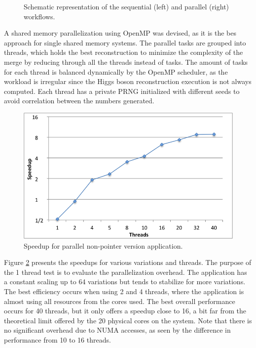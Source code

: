 \begin{figure}[!htp]
\begin{center}
		\caption{Schematic representation of the \ttDilepKinFit sequential (left) and parallel (right) workflows.}
		\label{fig:SeqPipeline}
	\end{center}
\end{figure}

A shared memory parallelization using OpenMP was devised, as it is the bes approach for single shared memory systems. The parallel tasks are grouped into threads, which holds the best reconstruction to minimize the complexity of the merge by reducing through all the threads instead of tasks. The amount of tasks for each thread is balanced dynamically by the OpenMP scheduler, as the workload is irregular since the Higgs boson reconstruction execution is not always computed. Each thread has a private PRNG initialized with different seeds to avoid correlation between the numbers generated.

\begin{figure}[!htp]
	\begin{center}
		\includegraphics[scale=0.4]{charts/speedup_non_pointer_omp.png}
		\caption{Speedup for \tth parallel non-pointer version application.}
		\label{fig:non_pointer_speedup}
	\end{center}
\end{figure}

Figure \ref{fig:non_pointer_speedup} presents the speedups for various variations and threads. The purpose of the 1 thread test is to evaluate the parallelization overhead. The application has a constant scaling up to 64 variations but tends to stabilize for more variations. The best efficiency occurs when using 2 and 4 threads, where the application is almost using all resources from the cores used. The best overall performance occurs for 40 threads, but it only offers a speedup close to 16, a bit far from the theoretical limit offered by the 20 physical cores on the system. Note that there is no significant overhead due to NUMA accesses, as seen by the difference in performance from 10 to 16 threads.

